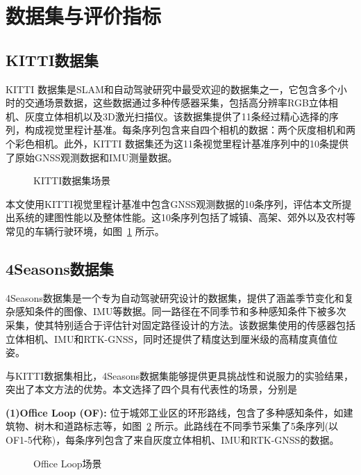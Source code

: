 \section{数据集与评价指标}
\subsection{KITTI数据集}
KITTI 数据集\cite{Geiger2012CVPR}是SLAM和自动驾驶研究中最受欢迎的数据集之一，它包含多个小时的交通场景数据，这些数据通过多种传感器采集，包括高分辨率RGB立体相机、灰度立体相机以及3D激光扫描仪。该数据集提供了11条经过精心选择的序列，构成视觉里程计基准。每条序列包含来自四个相机的数据：两个灰度相机和两个彩色相机。此外，KITTI 数据集还为这11条视觉里程计基准序列中的10条提供了原始GNSS观测数据和IMU测量数据。

\begin{figure}
  \centering
  \caption{KITTI数据集场景}
  \label{fig:kitti_data}
\end{figure}

本文使用KITTI视觉里程计基准中包含GNSS观测数据的10条序列，评估本文所提出系统的建图性能以及整体性能。这10条序列包括了城镇、高架、郊外以及农村等常见的车辆行驶环境，如图~\ref{fig:kitti_data} 所示。

\subsection{4Seasons数据集}
4Seasons数据集\cite{wenzel20214seasons}是一个专为自动驾驶研究设计的数据集，提供了涵盖季节变化和复杂感知条件的图像、IMU等数据。同一路径在不同季节和多种感知条件下被多次采集，使其特别适合于评估针对固定路径设计的方法。该数据集使用的传感器包括立体相机、IMU和RTK-GNSS，同时还提供了精度达到厘米级的高精度真值位姿。

与KITTI数据集相比，4Seasons数据集能够提供更具挑战性和说服力的实验结果，突出了本文方法的优势。本文选择了四个具有代表性的场景，分别是

\textbf{(1)Office Loop (OF):} 位于城郊工业区的环形路线，包含了多种感知条件，如建筑物、树木和道路标志等，如图~\ref{fig:OF_data} 所示。此路线在不同季节采集了5条序列(以OF1-5代称)，每条序列包含了来自灰度立体相机、IMU和RTK-GNSS的数据。
\begin{figure}
  \centering
  \caption{Office Loop场景}
  \label{fig:OF_data}
\end{figure}

